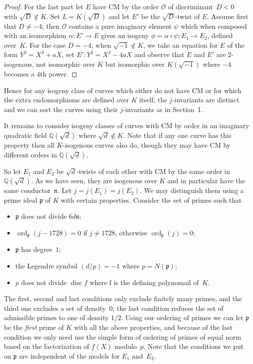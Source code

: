 \documentclass{article}
\def\Q{{\mathbb Q}}
\def\OO{{\mathcal O}}
\def\n{{\mathfrak n}}
\def\p{{\mathfrak p}}
\DeclareMathOperator{\disc}{disc}
\DeclareMathOperator{\ord}{ord}
\begin{document}
\begin{proof}
For the last part let $E$ have CM by the order $\OO$ of
discriminant~$D<0$ with $\sqrt{D}\notin K$.  Set $L=K(\sqrt{D})$ and
let $E'$ be the $\sqrt{D}$-twist of $E$.  Assume first that
$D\not=-4$; then $\OO$ contains a pure imaginary element $\psi$ which
when composed with an isomorphism $\alpha:E'\to E$ gives an isogeny
$\phi=\alpha\circ\psi:E_1\to E_2$, defined over~$K$.  For the case
$D=-4$, when $\sqrt{-1}\notin K$, we take an equation for $E$ of the
form $Y^2=X^3+aX$, set $E': Y^2=X^3-4aX$ and observe that $E$ and $E'$
are $2$-isogenous, not isomorphic over $K$ but isomorphic over
$K(\sqrt{-1})$ where $-4$ becomes a $4$th power.

\end{proof}

Hence for any isogeny class of curves which either do not have CM or
for which the extra endomorphisms are defined over $K$ itself, the
$j$-invariants are distinct and we can sort the curves using their
$j$-invariants as in Section~1.

It remains to consider isogeny classes of curves with CM by order in
an imaginary quadratic field $\Q(\sqrt{d})$ where $\sqrt{d}\notin K$.
Note that if any one curve has this property then all $K$-isogenous
curves also do, though they may have CM by different orders in
$\Q(\sqrt{d})$.

So let $E_1$ and $E_2$ be $\sqrt{d}$-twists of each other with CM by
the same order in $\Q(\sqrt{d})$.  As we have seen, they are isogenous
over $K$ and in particular have the same conductor~$\n$.  Let
$j=j(E_1)=j(E_2)$.  We may distinguish them using a prime ideal $\p$
of $K$ with certain properties.  Consider the set of primes such that
\begin{itemize}
\item $\p$ does not divide $6d\n$;
\item $\ord_{\p}(j-1728)=0$ if $j\not=1728$, otherwise
  $\ord_{\p}(j)=0$;
\item $\p$ has degree~$1$;
\item the Legendre symbol $(d/p)=-1$ where $p=N(\p)$;
\item $p$ does not divide $\disc f$ where f is the defining polynomail
  of~$K$.
\end{itemize}
The first, second and last conditions only exclude finitely many
primes, and the third one excludes a set of density~$0$; the last
condition reduces the set of admissible primes to one of density
$1/2$.  Using our ordering of primes we can let $\p$ be the
\textit{first} prime of $K$ with all the above properties, and because
of the last condition we only need use the simple form of ordering of
primes of equal norm based on the factorization of $f(X)$ modulo~$p$.
Note that the conditions we put on $\p$ are independent of the models
for $E_1$ and~$E_2$.
\end{document}
